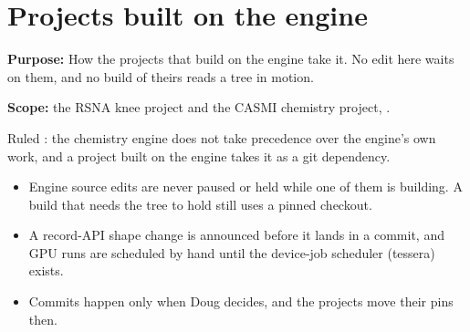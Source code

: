 \chapter{\texorpdfstring{Projects built on the engine}{Projects built on the engine}}
\label{chap:dependent-projects}

\textbf{Purpose:} How the projects that build on the engine take it. No edit here waits on them, and no build of theirs reads a tree in motion.

\textbf{Scope:} the RSNA knee project and the CASMI chemistry project, .

Ruled : the chemistry engine does not take precedence over the engine's own work, and a project built on the engine takes it as a git dependency.

\begin{itemize}
\item Engine source edits are never paused or held while one of them is building. A build that needs the tree to hold still uses a pinned checkout.
\item A record-API shape change is announced before it lands in a commit, and GPU runs are scheduled by hand until the device-job scheduler (tessera) exists.
\item Commits happen only when Doug decides, and the projects move their pins then.
\end{itemize}
